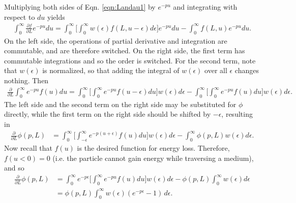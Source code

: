 Multiplying both sides of Eqn. \ref{eqn:Landau1} by $e^{-pu}$ and integrating with respect to $du$ yields
\begin{align*}
\int_0 ^\infty \frac{\partial f}{\partial L} e^{-pu} du = \int_0 ^\infty \Bigg [\int_0 ^\infty w(\epsilon) f(L,u-\epsilon) d\epsilon \Bigg]e^{-pu} du -  \int_0 ^\infty f(L,u) e^{-pu} du.
\end{align*}
On the left side, the operations of partial derivative and integration are commutable, and are therefore switched. On the right side, the first term has commutable integrations and so the order is switched. For the second term, note that $w(\epsilon)$ is normalized, so that adding the integral of $w(\epsilon)$ over all $\epsilon$ changes nothing. Then
\begin{align*}
\frac{\partial}{\partial L}\int_0 ^\infty e^{-pu} f(u) du = \int_0 ^\infty \Bigg[\int_0 ^\infty e^{-pu} f(u-\epsilon)  du \Bigg] w(\epsilon) d\epsilon -\int_0 ^\infty \Bigg[\int_0 ^\infty e^{-pu}f(u) du \Bigg] w(\epsilon) d\epsilon.
\end{align*}
The left side and the second term on the right side may be substituted for $\phi$ directly, while the first term on the right side should be shifted by $-\epsilon$, resulting in
\begin{align*}
\frac{\partial}{\partial L} \phi(p,L) &= \int_0 ^\infty \Bigg[\int_{-\epsilon} ^\infty e^{-p(u+\epsilon)} f(u)  du \Bigg] w(\epsilon) d\epsilon -\int_0 ^\infty \phi(p,L) w(\epsilon) d\epsilon.
\end{align*}
Now recall that $f(u)$ is the desired function for energy loss. Therefore, $f(u<0)=0$ (i.e. the particle cannot gain energy while traversing a medium), and so
\begin{align}
\frac{\partial}{\partial L} \phi(p,L) &= \int_0 ^\infty e^{-p\epsilon}\Bigg[\int_{0} ^\infty e^{-pu} f(u)  du \Bigg] w(\epsilon) d\epsilon -\phi(p,L) \int_0 ^\infty w(\epsilon) d\epsilon\nonumber\\
&=\phi(p,L)\int_0 ^\infty w(\epsilon)(e^{-p\epsilon}-1)\, d\epsilon. \nonumber%
\end{align}

